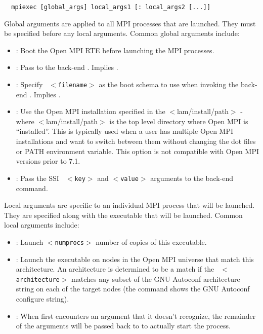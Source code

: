 \lstset{style=lam-cmdline}
\begin{lstlisting}
  mpiexec [global_args] local_args1 [: local_args2 [...]]
\end{lstlisting}

Global arguments are applied to all MPI processes that are launched.
They must be specified before any local arguments.  Common global
arguments include:

\begin{itemize}
\item {}: Boot the Open MPI RTE before launching the MPI
  processes.

\item {}: Pass  to the
  back-end .  Implies .

\item {}: Specify {\tt
    $<$filename$>$} as the boot schema to use when invoking the
    back-end .  Implies .

\item {}: Use the Open MPI
  installation specified in the $<$lam/install/path$>$ - where
  $<$lam/install/path$>$ is the top level directory where Open MPI is
  ``installed''. This is typically used when a user has multiple
  Open MPI installations and want to switch between them without
  changing the dot files or PATH environment variable.  This option is
  not compatible with Open MPI versions prior to 7.1.

\item {}: Pass the SSI {\tt
    $<$key$>$} and {\tt $<$value$>$} arguments to the back-end
     command.
\end{itemize}

Local arguments are specific to an individual MPI process that will be
launched.  They are specified along with the executable that will be
launched.  Common local arguments include:

\begin{itemize}
\item {}: Launch {\tt $<$numprocs$>$} number
  of copies of this executable.
  
\item {}: Launch the executable on
  nodes in the Open MPI universe that match this architecture.  An
  architecture is determined to be a match if the {\tt
    $<$architecture$>$} matches any subset of the GNU Autoconf
  architecture string on each of the target nodes (the 
  command shows the GNU Autoconf configure string).
  
\item {}: When  first
  encounters an argument that it doesn't recognize, the remainder of
  the arguments will be passed back to  to actually start
  the process.
\end{itemize}

